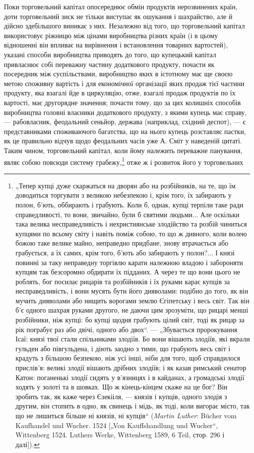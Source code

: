 Поки торговельний капітал опосереднює обмін продуктів
нерозвинених країн, доти торговельний зиск не тільки виступає
як ошукання і шахрайство, але й дійсно здебільшого виникає з них.
Незалежно від того, що торговельний капітал використовує ріжницю
між цінами виробництва різних країн (і в цьому відношенні
він впливає на вирівнення і встановлення товарних вартостей),
указані способи виробництва приводять до того, що
купецький капітал привласнює собі переважну частину додаткового
продукту, почасти як посередник між суспільствами, виробництво
яких в істотному має ще своєю метою споживну вартість
і для економічної організації яких продаж тієї частини продукту,
яка взагалі йде в циркуляцію, отже, взагалі продаж продуктів по
їх вартості, має другорядне значення; почасти тому, що за цих
колишніх способів виробництва головні власники додаткового
продукту, з якими купець має справу, — рабовласник, феодальний
сеньйор, держава (наприклад, східний деспот), — є представниками
споживаючого багатства, що на нього купець розставляє
пастки, як це правильно відчув щодо феодальних часів
уже А. Сміт у наведеній цитаті. Таким чином, торговельний капітал,
коли йому належить переважне панування, являє собою повсюди
систему грабежу,\footnote{
„Тепер купці дуже скаржаться на дворян або на розбійників, на те, що
їм доводиться торгувати з великою небезпекою і, крім того, їх забирають у полон,
б’ють, оббирають і грабують. Коли б, однак, купці терпіли таке ради
справедливості, то вони, звичайно, були б святими людьми... Але оскільки така
велика несправедливість і нехристиянське злодійство та розбій чиниться купцями
по всьому світу і навіть поміж собою, то що ж дивного, коли волею
божою таке велике майно, неправедно придбане, знову втрачається або
грабується, а їх самих, крім того, б’ють або забирають у полон?... І князі
повинні за таку неправедну торгівлю карати належною владою і забороняти
купцям так безсоромно обдирати їх підданих. А через те що вони цього не
роблять, бог посилає рицарів та розбійників і їх руками карає купців за несправедливість,
і вони мусять бути його дияволами: подібно до того, як він мучить
дияволами або нищить ворогами землю Єгіпетську і весь світ. Так він б’є
одного шахрая руками другого, не даючи цим зрозуміти, що рицарі менші
розбійники, ніж купці: бо купці щодня грабують цілий світ, тоді як рицар за рік
пограбує раз або двічі, одного або двох“. — „Збувається пророкування Ісаї:
князі твої стали спільниками злодіїв. Бо вони вішають злодіїв, які вкрали гульден
або півгульдена, і діють заодно з тими, що грабують весь світ і крадуть
з більшою безпекою, ніж усі інші, ніби для того, щоб справдилося прислів’я:
великі злодії вішають дрібних злодіїв; і як казав римський сенатор Катон: поганенькі
злодії сидять у в’язницях і в кайданах, а громадські злодії ходять
у золоті та в шовках. Що ж кінець-кінцем скаже на це бог? Він зробить так,
як каже через Єзекііля, — князів і купців, одного злодія з другим, він стопить
в одно, як свинець і мідь, як тоді, коли вигорає місто, так що не лишиться більше
ні князів, ні купців“ (\emph{Martin Luther}: Bücher vom Kaufhandel und Wucher. 1524
[„Von Kauffshandlung und Wucher“, Wittenberg 1524. Luthers Werke, Wittenberg
1589, 6 Teil, стор. 296 і далі]).
} отже ж і розвиток його у торговельних
